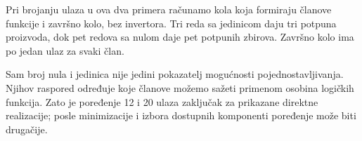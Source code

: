 Pri brojanju ulaza u ova dva primera računamo kola koja formiraju članove funkcije i završno kolo, bez invertora. Tri reda sa jedinicom daju tri potpuna proizvoda, dok pet redova sa nulom daje pet potpunih zbirova. Završno kolo ima po jedan ulaz za svaki član.

Sam broj nula i jedinica nije jedini pokazatelj mogućnosti pojednostavljivanja. Njihov raspored određuje koje članove možemo sažeti primenom osobina logičkih funkcija. Zato je poređenje 12 i 20 ulaza zaključak za prikazane direktne realizacije; posle minimizacije i izbora dostupnih komponenti poređenje može biti drugačije.

